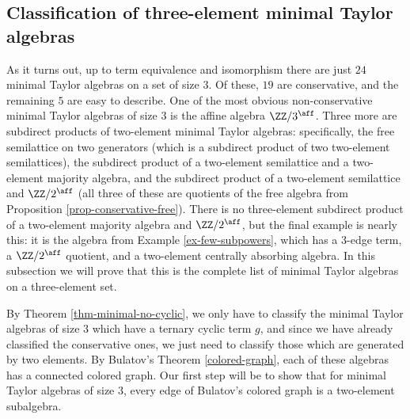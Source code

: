 \subsection{Classification of three-element minimal Taylor algebras}\label{ss-minimal-three}

As it turns out, up to term equivalence and isomorphism there are just $24$ minimal Taylor algebras on a set of size $3$. Of these, $19$ are conservative, and the remaining $5$ are easy to describe. One of the most obvious non-conservative minimal Taylor algebras of size $3$ is the affine algebra $\ZZ/3^{\aff}$. Three more are subdirect products of two-element minimal Taylor algebras: specifically, the free semilattice on two generators (which is a subdirect product of two two-element semilattices), the subdirect product of a two-element semilattice and a two-element majority algebra, and the subdirect product of a two-element semilattice and $\ZZ/2^{\aff}$ (all three of these are quotients of the free algebra from Proposition \ref{prop-conservative-free}). There is no three-element subdirect product of a two-element majority algebra and $\ZZ/2^{\aff}$, but the final example is nearly this: it is the algebra from Example \ref{ex-few-subpowers}, which has a $3$-edge term, a $\ZZ/2^{\aff}$ quotient, and a two-element centrally absorbing algebra. In this subsection we will prove that this is the complete list of minimal Taylor algebras on a three-element set.

By Theorem \ref{thm-minimal-no-cyclic}, we only have to classify the minimal Taylor algebras of size $3$ which have a ternary cyclic term $g$, and since we have already classified the conservative ones, we just need to classify those which are generated by two elements. By Bulatov's Theorem \ref{colored-graph}, each of these algebras has a connected colored graph. Our first step will be to show that for minimal Taylor algebras of size $3$, every edge of Bulatov's colored graph is a two-element subalgebra.

